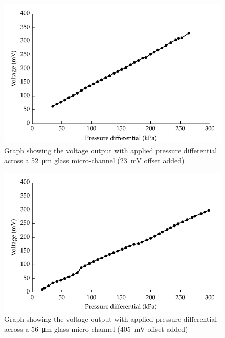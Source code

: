 \begin{figure}
    \centering
    \includegraphics{content/pt1/01-PowerHarvesting/graphics/streamingCell_voltVsPress_52um_out}
    \caption{\label{fig:VvsP_52um}Graph showing the voltage output with applied pressure differential across a \SI{52}{\micro\metre} glass micro-channel (\SI{23}{\milli\volt} offset added)}
\end{figure}

\begin{figure}
    \centering
    \includegraphics{content/pt1/01-PowerHarvesting/graphics/streamingCell_voltVsPress_56um_out}
    \caption{\label{fig:VvsP_56um}Graph showing the voltage output with applied pressure differential across a \SI{56}{\micro\metre} glass micro-channel (\SI{405}{\milli\volt} offset added)}
\end{figure}

